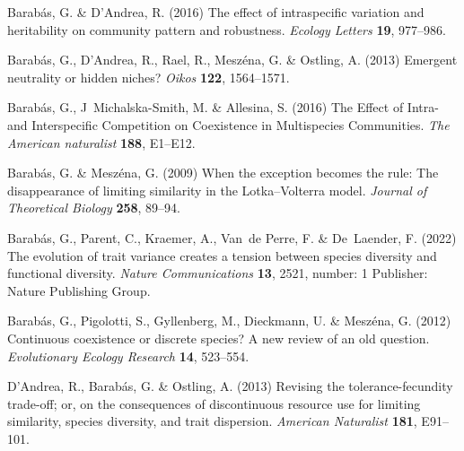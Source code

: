 \documentclass[10pt]{article}
\begin{document}
%
%
\begin{thebibliography}{18}
\providecommand{\natexlab}[1]{#1}

Barab{\'a}s, G. \& D'Andrea, R. (2016) The effect of intraspecific variation
  and heritability on community pattern and robustness. \emph{Ecology Letters}
  \textbf{19}, 977--986.

Barab\'{a}s, G., {D'Andrea}, R., Rael, R., Mesz{\'e}na, G. \& Ostling, A.
  (2013) Emergent neutrality or hidden niches? \emph{Oikos} \textbf{122},
  1564--1571.

Barabás, G., J~Michalska-Smith, M. \& Allesina, S. (2016) The {Effect} of
  {Intra}- and {Interspecific} {Competition} on {Coexistence} in {Multispecies}
  {Communities}. \emph{The American naturalist} \textbf{188}, E1--E12.

Barabás, G. \& Meszéna, G. (2009) When the exception becomes the rule: {The}
  disappearance of limiting similarity in the {Lotka}–{Volterra} model.
  \emph{Journal of Theoretical Biology} \textbf{258}, 89--94.

Barabás, G., Parent, C., Kraemer, A., Van~de Perre, F. \& De~Laender, F.
  (2022) The evolution of trait variance creates a tension between species
  diversity and functional diversity. \emph{Nature Communications} \textbf{13},
  2521, number: 1 Publisher: Nature Publishing Group.

Barabás, G., Pigolotti, S., Gyllenberg, M., Dieckmann, U. \& Meszéna, G.
  (2012) Continuous coexistence or discrete species? {A} new review of an old
  question. \emph{Evolutionary Ecology Research} \textbf{14}, 523--554.

D'Andrea, R., Barab\'as, G. \& Ostling, A. (2013) Revising the
  tolerance-fecundity trade-off; or, on the consequences of discontinuous
  resource use for limiting similarity, species diversity, and trait
  dispersion. \emph{American Naturalist} \textbf{181}, E91--101.


\end{thebibliography}
\end{document}
